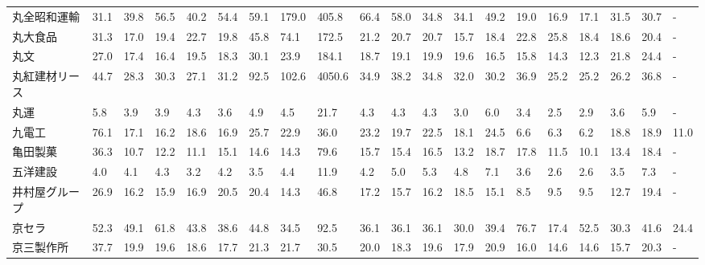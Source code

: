 \begin{longtable}[c]{lp{3mm}p{3mm}p{3mm}p{3mm}p{3mm}p{3mm}p{3mm}p{3mm}p{3mm}p{3mm}p{3mm}p{3mm}p{3mm}p{3mm}p{3mm}p{3mm}p{3mm}p{3mm}p{3mm}}
丸全昭和運輸          &   31.1 &   39.8 &      56.5 &      40.2 &       54.4 &    59.1 &   179.0 &    405.8 &    66.4 &    58.0 &   34.8 &   34.1 &    49.2 &    19.0 &    16.9 &   17.1 &   31.5 &    30.7 &      - \\
丸大食品            &   31.3 &   17.0 &      19.4 &      22.7 &       19.8 &    45.8 &    74.1 &    172.5 &    21.2 &    20.7 &   20.7 &   15.7 &    18.4 &    22.8 &    25.8 &   18.4 &   18.6 &    20.4 &      - \\
丸文              &   27.0 &   17.4 &      16.4 &      19.5 &       18.3 &    30.1 &    23.9 &    184.1 &    18.7 &    19.1 &   19.9 &   19.6 &    16.5 &    15.8 &    14.3 &   12.3 &   21.8 &    24.4 &      - \\
丸紅建材リース         &   44.7 &   28.3 &      30.3 &      27.1 &       31.2 &    92.5 &   102.6 &   4050.6 &    34.9 &    38.2 &   34.8 &   32.0 &    30.2 &    36.9 &    25.2 &   25.2 &   26.2 &    36.8 &      - \\
丸運              &    5.8 &    3.9 &       3.9 &       4.3 &        3.6 &     4.9 &     4.5 &     21.7 &     4.3 &     4.3 &    4.3 &    3.0 &     6.0 &     3.4 &     2.5 &    2.9 &    3.6 &     5.9 &      - \\
九電工             &   76.1 &   17.1 &      16.2 &      18.6 &       16.9 &    25.7 &    22.9 &     36.0 &    23.2 &    19.7 &   22.5 &   18.1 &    24.5 &     6.6 &     6.3 &    6.2 &   18.8 &    18.9 &   11.0 \\
亀田製菓            &   36.3 &   10.7 &      12.2 &      11.1 &       15.1 &    14.6 &    14.3 &     79.6 &    15.7 &    15.4 &   16.5 &   13.2 &    18.7 &    17.8 &    11.5 &   10.1 &   13.4 &    18.4 &      - \\
五洋建設            &    4.0 &    4.1 &       4.3 &       3.2 &        4.2 &     3.5 &     4.4 &     11.9 &     4.2 &     5.0 &    5.3 &    4.8 &     7.1 &     3.6 &     2.6 &    2.6 &    3.5 &     7.3 &      - \\
井村屋グループ         &   26.9 &   16.2 &      15.9 &      16.9 &       20.5 &    20.4 &    14.3 &     46.8 &    17.2 &    15.7 &   16.2 &   18.5 &    15.1 &     8.5 &     9.5 &    9.5 &   12.7 &    19.4 &      - \\
京セラ             &   52.3 &   49.1 &      61.8 &      43.8 &       38.6 &    44.8 &    34.5 &     92.5 &    36.1 &    36.1 &   36.1 &   30.0 &    39.4 &    76.7 &    17.4 &   52.5 &   30.3 &    41.6 &   24.4 \\
京三製作所           &   37.7 &   19.9 &      19.6 &      18.6 &       17.7 &    21.3 &    21.7 &     30.5 &    20.0 &    18.3 &   19.6 &   17.9 &    20.9 &    16.0 &    14.6 &   14.6 &   15.7 &    20.3 &      - \\

\end{longtable}
